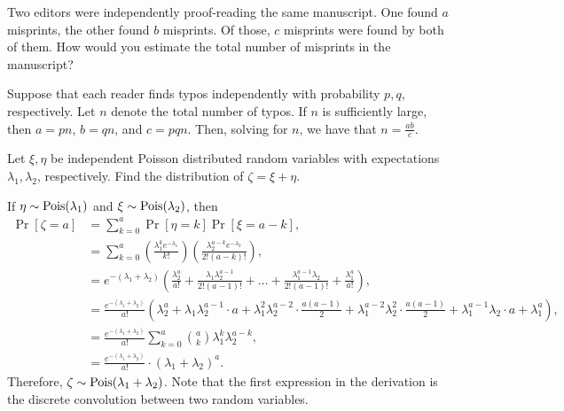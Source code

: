 \begin{problem}{9}
    Two editors were independently proof-reading the same manuscript. One found $a$ misprints, the other found $b$ misprints. Of those, $c$ misprints were found by both of them. How would you estimate the total number of misprints in the manuscript?
\end{problem}
\begin{solution}
    Suppose that each reader finds typos independently with probability $p, q$, respectively. Let $n$ denote the total number of typos. If $n$ is sufficiently large, then $a = pn$, $b = qn$, and $c = pqn$. Then, solving for $n$, we have that $n = \frac{ab}{c}$. 
\end{solution}

\begin{problem}{10}
    Let $\xi,\eta$ be independent Poisson distributed random variables with expectations $\lambda_1,\lambda_2$, respectively. Find the distribution of $\zeta = \xi + \eta$. 
\end{problem}
\begin{solution}
    If $\eta \sim \operatorname{Pois}(\lambda_1)$ and $\xi \sim \operatorname{Pois}(\lambda_2)$, then 
    \begin{align*}
        \Pr[\zeta = a] &= \sum_{k=0}^a \Pr[\eta = k]\Pr[\xi = a - k], \\
        &= \sum_{k=0}^a \left(\frac{\lambda_1^k e^{-\lambda_1}}{k!}\right)\left(\frac{\lambda_2^{a-k}e^{-\lambda_2}}{2!(a-k)!}\right), \\
        &= e^{-(\lambda_1 + \lambda_2)}\left(\frac{\lambda_2^a}{a!} + \frac{\lambda_1\lambda_2^{a-1}}{2!(a-1)!} + \ldots + \frac{\lambda_1^{a-1}\lambda_2}{2!(a-1)!} + \frac{\lambda_1^a}{a!}\right), \\
        &= \frac{e^{-(\lambda_1 + \lambda_2)}}{a!}\left(\lambda_2^a + \lambda_1\lambda_2^{a-1}\cdot a + \lambda_1^2\lambda_2^{a-2} \cdot \frac{a(a-1)}{2} + \lambda_1^{a-2}\lambda_2^2 \cdot \frac{a(a-1)}{2} + \lambda_1^{a-1}\lambda_2 \cdot a + \lambda_1^a\right), \\
        &=  \frac{e^{-(\lambda_1 + \lambda_2)}}{a!} \sum_{k=0}^a \binom{a}{k} \lambda_1^k \lambda_2^{a-k}, \\
        &= \frac{e^{-(\lambda_1 + \lambda_2)}}{a!} \cdot (\lambda_1 + \lambda_2)^a.
    \end{align*}
    Therefore, $\zeta \sim \operatorname{Pois}(\lambda_1 + \lambda_2)$. Note that the first expression in the derivation is the discrete convolution between two random variables. 
\end{solution}

